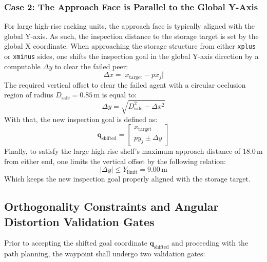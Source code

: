 \subsubsection*{Case 2: The Approach Face is Parallel to the Global Y-Axis}

For large high-rise racking units, the approach face is typically aligned with the global Y-axis. As such, the inspection distance to the storage target is set by the global X coordinate. When approaching the storage structure from either \texttt{xplus} or \texttt{xminus} sides, one shifts the inspection goal in the global Y-axis direction by a computable $\Delta y$ to clear the failed peer:
\begin{equation} \Delta x = \lvert x_{\text{target}} - px_j \rvert \label{eq:perpendicular_x_distance} \end{equation}
The required vertical offset to clear the failed agent with a circular occlusion region of radius $D_{\text{safe}} = 0.85\,\text{m}$ is equal to:
\begin{equation} \Delta y = \sqrt{D_{\text{safe}}^2 - \Delta x^2} \label{eq:pythagorean_y_shift} \end{equation}
With that, the new inspection goal is defined as:
\begin{equation} \mathbf{q}_{\text{shifted}} = \begin{bmatrix} x_{\text{target}} \\ py_j \pm \Delta y \end{bmatrix} \label{eq:shifted_goal_y_axis} \end{equation}
Finally, to satisfy the large high-rise shelf's maximum approach distance of $18.0\,\text{m}$ from either end, one limits the vertical offset by the following relation:
\begin{equation} \lvert\Delta y\rvert \le Y_{\text{limit}} = 9.00\,\text{m} \label{eq:large_shelf_shift_bound} \end{equation}
Which keeps the new inspection goal properly aligned with the storage target.

\subsection{Orthogonality Constraints and Angular Distortion Validation Gates}

Prior to accepting the shifted goal coordinate $\mathbf{q}_{\text{shifted}}$ and proceeding with the path planning, the waypoint shall undergo two validation gates:

